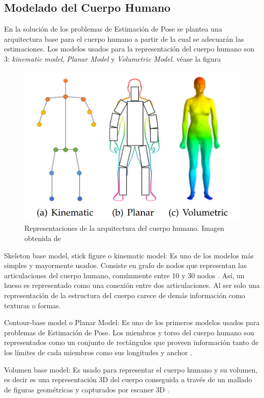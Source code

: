 \subsection{Modelado del Cuerpo Humano}

En la solución de los problemas de Estimación de Pose se plantea una arquitectura base para el
cuerpo humano a partir de la cual se adecuarán las estimaciones. Los modelos usados para la
representación del cuerpo humano son 3: \textit{kinematic model}, \textit{Planar Model} y
\textit{Volumetric Model}. véase la figura

\begin{figure}[ht!]
    \centering
    \includegraphics[width=0.7 \textwidth]{Chapters/1. HPE_LUNG/figures/body_model.png}
    \caption{Representaciones de la arquitectura del cuerpo humano. Imagen obtenida de \citeauthor{DBLP:journals/corr/FangXL16}}
    \label{fig:alphapose}
\end{figure}


Skeleton base model, stick figure o kinematic model:
Es uno de los modelos más simples y mayormente usados. Consiste en grafo de nodos que representan
las articulaciones del cuerpo humano, comúnmente entre 10 y 30 nodos \cite{Felzenszwalb2005}.
Así, un hueso es representado como una conexión entre dos articulaciones. Al ser solo una
representación de la estructura del cuerpo carece de demás información como texturas o formas.

Contour-base model o Planar Model:
Es uno de los primeros modelos usados para problemas de Estimación de Pose. Los miembros y torso del
cuerpo humano son representados como un conjunto de rectángulos que proveen información tanto de los
límites de cada miembros como sus longitudes y anchor \cite{557241} \cite{COOTES199538}.

Volumen base model:
Es usado para representar el cuerpo humano y su volumen, es decir es una representación 3D del
cuerpo conseguida a través de un mallado de figuras geométricas y capturados por escaner 3D
\cite{840661}.

